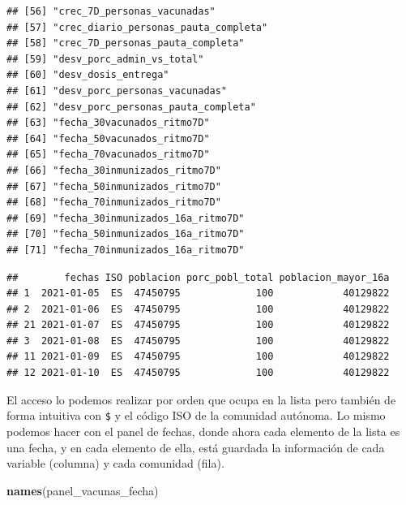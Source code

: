 \documentclass[11pt,]{book}
\newenvironment{Shaded}{\begin{snugshade}}{\end{snugshade}}
\newcommand{\DecValTok}[1]{\textcolor[rgb]{0.06,0.06,0.06}{#1}}
\newcommand{\KeywordTok}[1]{\textcolor[rgb]{0.27,0.27,0.27}{\textbf{#1}}}
\newcommand{\NormalTok}[1]{#1}
\newcommand{\OperatorTok}[1]{\textcolor[rgb]{0.43,0.43,0.43}{\textbf{#1}}}
\begin{document}
\begin{verbatim}
## [56] "crec_7D_personas_vacunadas"          
## [57] "crec_diario_personas_pauta_completa" 
## [58] "crec_7D_personas_pauta_completa"     
## [59] "desv_porc_admin_vs_total"            
## [60] "desv_dosis_entrega"                  
## [61] "desv_porc_personas_vacunadas"        
## [62] "desv_porc_personas_pauta_completa"   
## [63] "fecha_30vacunados_ritmo7D"           
## [64] "fecha_50vacunados_ritmo7D"           
## [65] "fecha_70vacunados_ritmo7D"           
## [66] "fecha_30inmunizados_ritmo7D"         
## [67] "fecha_50inmunizados_ritmo7D"         
## [68] "fecha_70inmunizados_ritmo7D"         
## [69] "fecha_30inmunizados_16a_ritmo7D"     
## [70] "fecha_50inmunizados_16a_ritmo7D"     
## [71] "fecha_70inmunizados_16a_ritmo7D"
\end{verbatim}

\begin{Shaded}
\end{Shaded}

\begin{verbatim}
##        fechas ISO poblacion porc_pobl_total poblacion_mayor_16a
## 1  2021-01-05  ES  47450795             100            40129822
## 2  2021-01-06  ES  47450795             100            40129822
## 21 2021-01-07  ES  47450795             100            40129822
## 3  2021-01-08  ES  47450795             100            40129822
## 11 2021-01-09  ES  47450795             100            40129822
## 12 2021-01-10  ES  47450795             100            40129822
\end{verbatim}

El acceso lo podemos realizar por orden que ocupa en la lista pero también de forma intuitiva con \texttt{\$} y el código ISO de la comunidad autónoma. Lo mismo podemos hacer con el panel de fechas, donde ahora cada elemento de la lista es una fecha, y en cada elemento de ella, está guardada la información de cada variable (columna) y cada comunidad (fila).

\begin{Shaded}
\begin{Highlighting}[]
\KeywordTok{names}\NormalTok{(panel_vacunas_fecha)}
\end{Highlighting}
\end{Shaded}
\end{document}
